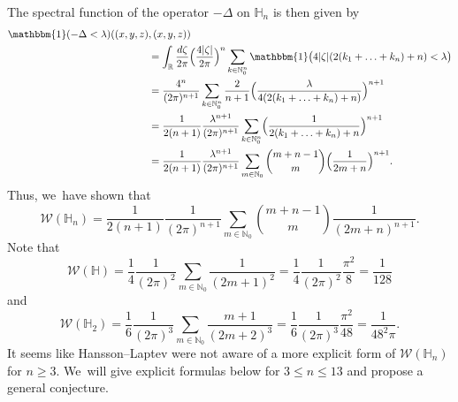 \documentclass[JEP,XML,SOM,Unicode,published]{cedram}
\theoremstyle{definition}
\newcommand{\1}{\mathbbm{1}}
\newcommand{\N}{\mathbb{N}}
\newcommand{\R}{\mathbb{R}}
\begin{document}
The spectral function of the operator $-\Delta$ on $\mathbb H_n$ is then given by
\begin{align*}
\1(-\Delta<\lambda)((x,y,z)&,(x,y,z)) \\
& = \int_\R \frac{d\zeta}{2\pi} \Bigl(\frac{4|\zeta|}{2\pi}\Bigr)^n \sum_{k \in\N_0^n} \1\bigl(4|\zeta|(2(k_1+\ldots+k_n)+n)<\lambda\bigr) \\
& = \frac{4^n}{(2\pi)^{n+1}} \sum_{k\in\N_0^n} \frac{2}{n+1} \Bigl(\frac{\lambda}{4(2(k_1+\ldots+k_n)+n)}\Bigr)^{n+1} \\
& = \frac{1}{2(n+1)} \frac{\lambda^{n+1}}{(2\pi)^{n+1}} \sum_{k\in\N_0^n} \Bigl(\frac{1}{2(k_1+\ldots+k_n)+n}\Bigr)^{n+1} \\
& = \frac{1}{2(n+1)} \frac{\lambda^{n+1}}{(2\pi)^{n+1}} \sum_{m\in\N_0} \binom{m+n-1}{m} \Bigl(\frac{1}{2m+n}\Bigr)^{n+1}.
\end{align*}
Thus, we~have shown that
\begin{equation}\label{w4}
\mathcal W(\mathbb H_n) = \frac{1}{2(n+1)} \frac{1}{(2\pi)^{n+1}} \sum_{m\in\N_0} \binom{m+n-1}{m} \frac{1}{(2m+n)^{n+1}}.
\end{equation}
Note that
\begin{equation}\label{eq:W1}
\mathcal W(\mathbb H) = \frac{1}{4} \frac{1}{(2\pi)^2} \sum_{m\in\N_0} \frac{1}{(2m+1)^2} = \frac14 \frac1{(2\pi)^2} \frac{\pi^2}8 = \frac1{128}
\end{equation}
and
\begin{equation}\label{eq:W2}
\mathcal W(\mathbb H_2) = \frac{1}{6} \frac{1}{(2\pi)^3} \sum_{m\in\N_0} \frac{m+1}{(2m+2)^3} = \frac{1}{6} \frac{1}{(2\pi)^3} \frac{\pi^2}{48} = \frac{1}{48^2 \pi}.
\end{equation}
It seems like Hansson--Laptev \cite{HL} were not aware of a more explicit form of $\mathcal W(\mathbb H_n)$ for $n\geq 3$. We~will give explicit formulas below for $3\leq n \leq 13$ and propose a general conjecture.
\end{document}
